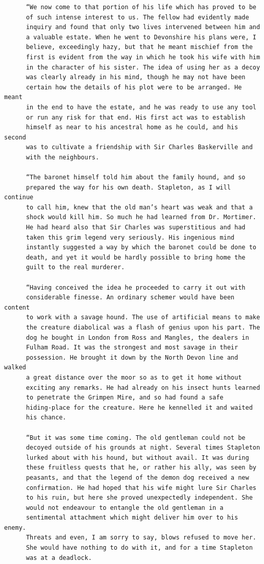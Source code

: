 \documentclass{article}
\begin{document}
\begin{verbatim}
      “We now come to that portion of his life which has proved to be
      of such intense interest to us. The fellow had evidently made
      inquiry and found that only two lives intervened between him and
      a valuable estate. When he went to Devonshire his plans were, I
      believe, exceedingly hazy, but that he meant mischief from the
      first is evident from the way in which he took his wife with him
      in the character of his sister. The idea of using her as a decoy
      was clearly already in his mind, though he may not have been
      certain how the details of his plot were to be arranged. He meant
      in the end to have the estate, and he was ready to use any tool
      or run any risk for that end. His first act was to establish
      himself as near to his ancestral home as he could, and his second
      was to cultivate a friendship with Sir Charles Baskerville and
      with the neighbours.

      “The baronet himself told him about the family hound, and so
      prepared the way for his own death. Stapleton, as I will continue
      to call him, knew that the old man’s heart was weak and that a
      shock would kill him. So much he had learned from Dr. Mortimer.
      He had heard also that Sir Charles was superstitious and had
      taken this grim legend very seriously. His ingenious mind
      instantly suggested a way by which the baronet could be done to
      death, and yet it would be hardly possible to bring home the
      guilt to the real murderer.

      “Having conceived the idea he proceeded to carry it out with
      considerable finesse. An ordinary schemer would have been content
      to work with a savage hound. The use of artificial means to make
      the creature diabolical was a flash of genius upon his part. The
      dog he bought in London from Ross and Mangles, the dealers in
      Fulham Road. It was the strongest and most savage in their
      possession. He brought it down by the North Devon line and walked
      a great distance over the moor so as to get it home without
      exciting any remarks. He had already on his insect hunts learned
      to penetrate the Grimpen Mire, and so had found a safe
      hiding-place for the creature. Here he kennelled it and waited
      his chance.

      “But it was some time coming. The old gentleman could not be
      decoyed outside of his grounds at night. Several times Stapleton
      lurked about with his hound, but without avail. It was during
      these fruitless quests that he, or rather his ally, was seen by
      peasants, and that the legend of the demon dog received a new
      confirmation. He had hoped that his wife might lure Sir Charles
      to his ruin, but here she proved unexpectedly independent. She
      would not endeavour to entangle the old gentleman in a
      sentimental attachment which might deliver him over to his enemy.
      Threats and even, I am sorry to say, blows refused to move her.
      She would have nothing to do with it, and for a time Stapleton
      was at a deadlock.


\end{verbatim}
\end{document}
